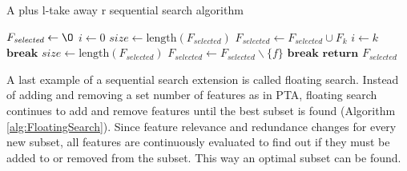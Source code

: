\begin{itemize}
		\begin{algorithm}[H]
			\caption{A plus l-take away r sequential search algorithm\cite{Reunanen2006}}\label{alg:PTA}
			\begin{algorithmic}[1]
				\State $F_{\textit{selected}} \gets \O$			
				\State $i \gets 0$								
									
				\State $\textit{size} \gets \text{length}(F_{\textit{selected}})$ 
					
					
				\State $F_{\textit{selected}} \gets F_{\textit{selected}} \cup F_k$ 
				\EndIf
				\State $i \gets k$						
				 	
				\State $\textbf{break}$
				\EndIf
				\EndFor
				\State $\textit{size} \gets \text{length}(F_{\textit{selected}})$ 
					
					
				\State $F_{\textit{selected}} \gets F_{\textit{selected}} \backslash \{f\}$ 
				\EndIf
				 	
				\State $\textbf{break}$
				\EndIf
				\EndFor
				\EndWhile
				\State $\textbf{return } F_{\textit{selected}}$
				\EndProcedure
			\end{algorithmic}
		\end{algorithm}
		
		A last example of a sequential search extension is called floating search. Instead of adding and removing a set number of features as in PTA, floating search continues to add and remove features until the best subset is found (Algorithm \ref{alg:FloatingSearch}). Since feature relevance and redundance changes for every new subset, all features are continuously evaluated to find out if they must be added to or removed from the subset. This way an optimal subset can be found\cite{Reunanen2006}.
		

\end{itemize}
